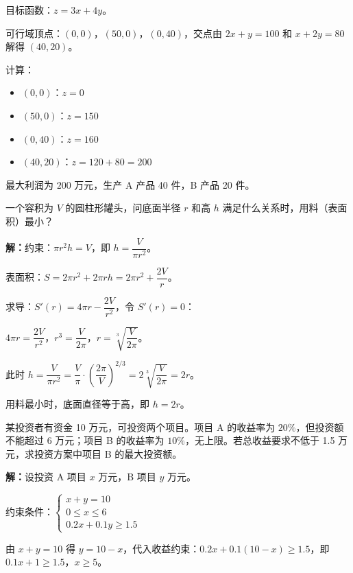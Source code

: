 \documentclass[12pt, a4paper]{ctexart}
\begin{document}
目标函数：$z = 3x + 4y$。

可行域顶点：$(0, 0)$，$(50, 0)$，$(0, 40)$，交点由 $2x + y = 100$ 和 $x + 2y = 80$ 解得 $(40, 20)$。

计算：
\begin{itemize}
  \item $(0, 0)$：$z = 0$
  \item $(50, 0)$：$z = 150$
  \item $(0, 40)$：$z = 160$
  \item $(40, 20)$：$z = 120 + 80 = 200$
\end{itemize}

最大利润为 $\boxed{200}$ 万元，生产 A 产品 40 件，B 产品 20 件。

\begin{appbox}[【应用2】用料最优化]
一个容积为 $V$ 的圆柱形罐头，问底面半径 $r$ 和高 $h$ 满足什么关系时，用料（表面积）最小？
\end{appbox}

\textbf{解：}约束：$\pi r^2 h = V$，即 $h = \dfrac{V}{\pi r^2}$。

表面积：$S = 2\pi r^2 + 2\pi rh = 2\pi r^2 + \dfrac{2V}{r}$。

求导：$S'(r) = 4\pi r - \dfrac{2V}{r^2}$，令 $S'(r) = 0$：

$4\pi r = \dfrac{2V}{r^2}$，$r^3 = \dfrac{V}{2\pi}$，$r = \sqrt[3]{\dfrac{V}{2\pi}}$。

此时 $h = \dfrac{V}{\pi r^2} = \dfrac{V}{\pi} \cdot \left(\dfrac{2\pi}{V}\right)^{2/3} = 2\sqrt[3]{\dfrac{V}{2\pi}} = 2r$。

用料最小时，底面直径等于高，即 $h = 2r$。

\begin{appbox}[【应用3】投资收益最大化]
某投资者有资金 10 万元，可投资两个项目。项目 A 的收益率为 $20\%$，但投资额不能超过 6 万元；项目 B 的收益率为 $10\%$，无上限。若总收益要求不低于 1.5 万元，求投资方案中项目 B 的最大投资额。
\end{appbox}

\textbf{解：}设投资 A 项目 $x$ 万元，B 项目 $y$ 万元。

约束条件：$\begin{cases} x + y = 10 \\ 0 \le x \le 6 \\ 0.2x + 0.1y \ge 1.5 \end{cases}$

由 $x + y = 10$ 得 $y = 10 - x$，代入收益约束：$0.2x + 0.1(10-x) \ge 1.5$，即 $0.1x + 1 \ge 1.5$，$x \ge 5$。
\end{document}
